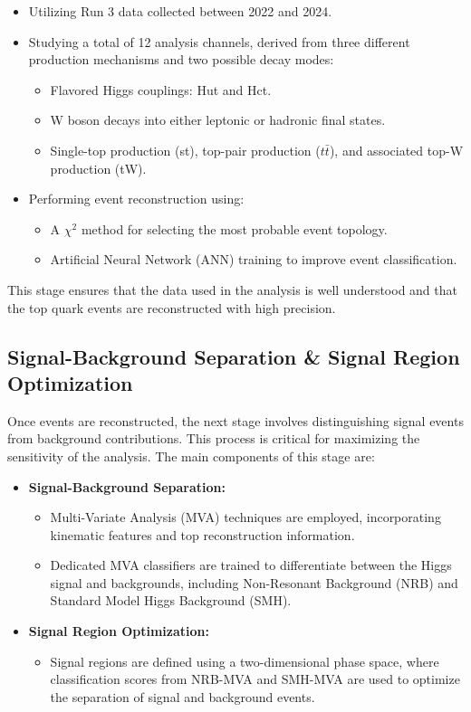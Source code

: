 \begin{itemize}
\item Utilizing Run 3 data collected between 2022 and 2024.
\item Studying a total of 12 analysis channels, derived from three different production mechanisms and two possible decay modes:
\begin{itemize}
\item Flavored Higgs couplings: Hut and Hct.
\item W boson decays into either leptonic or hadronic final states.
\item Single-top production (st), top-pair production ($t\bar{t}$), and associated top-W production (tW).
\end{itemize}
\item Performing event reconstruction using:
\begin{itemize}
\item A $\chi^2$ method for selecting the most probable event topology.
\item Artificial Neural Network (ANN) training to improve event classification.
\end{itemize}
\end{itemize}

This stage ensures that the data used in the analysis is well understood and that the top quark events are reconstructed with high precision.

\subsection{Signal-Background Separation \& Signal Region Optimization}
Once events are reconstructed, the next stage involves distinguishing signal events from background contributions. This process is critical for maximizing the sensitivity of the analysis. The main components of this stage are:

\begin{itemize}
\item \textbf{Signal-Background Separation:}
\begin{itemize}
\item Multi-Variate Analysis (MVA) techniques are employed, incorporating kinematic features and top reconstruction information.
\item Dedicated MVA classifiers are trained to differentiate between the Higgs signal and backgrounds, including Non-Resonant Background (NRB) and Standard Model Higgs Background (SMH).
\end{itemize}
\item \textbf{Signal Region Optimization:}
\begin{itemize}
\item Signal regions are defined using a two-dimensional phase space, where classification scores from NRB-MVA and SMH-MVA are used to optimize the separation of signal and background events.
\end{itemize}
\end{itemize}

